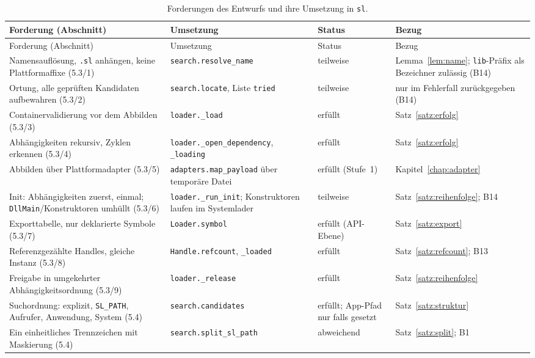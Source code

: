 {\small
\begin{longtable}{@{}L{4.1cm}L{4.5cm}L{2.2cm}L{3.6cm}@{}}
\caption{Forderungen des Entwurfs und ihre Umsetzung in \texttt{sl}.}\label{tab:konformitaet}\\
\toprule
Forderung (Abschnitt) & Umsetzung & Status & Bezug \\
\midrule
\endfirsthead
\toprule
Forderung (Abschnitt) & Umsetzung & Status & Bezug \\
\midrule
\endhead
\bottomrule
\endfoot
Namensauflösung, \texttt{.sl} anhängen, keine Plattformaffixe (5.3/1) & \texttt{search.resolve\_name} & teilweise & Lemma~\ref{lem:name}; \texttt{lib}-Präfix als Bezeichner zulässig (B14) \\[0.3em]
Ortung, alle geprüften Kandidaten aufbewahren (5.3/2) & \texttt{search.locate}, Liste \texttt{tried} & teilweise & nur im Fehlerfall zurückgegeben (B14) \\[0.3em]
Containervalidierung vor dem Abbilden (5.3/3) & \texttt{loader.\_load} & erfüllt & Satz~\ref{satz:erfolg} \\[0.3em]
Abhängigkeiten rekursiv, Zyklen erkennen (5.3/4) & \texttt{loader.\_open\_dependency}, \texttt{\_loading} & erfüllt & Satz~\ref{satz:erfolg} \\[0.3em]
Abbilden über Plattformadapter (5.3/5) & \texttt{adapters.map\_payload} über temporäre Datei & erfüllt (Stufe~1) & Kapitel~\ref{chap:adapter} \\[0.3em]
Init: Abhängigkeiten zuerst, einmal; \texttt{DllMain}/Konstruktoren umhüllt (5.3/6) & \texttt{loader.\_run\_init}; Konstruktoren laufen im Systemlader & teilweise & Satz~\ref{satz:reihenfolge}; B14 \\[0.3em]
Exporttabelle, nur deklarierte Symbole (5.3/7) & \texttt{Loader.symbol} & erfüllt (API-Ebene) & Satz~\ref{satz:export} \\[0.3em]
Referenzgezählte Handles, gleiche Instanz (5.3/8) & \texttt{Handle.refcount}, \texttt{\_loaded} & erfüllt & Satz~\ref{satz:refcount}; B13 \\[0.3em]
Freigabe in umgekehrter Abhängigkeitsordnung (5.3/9) & \texttt{loader.\_release} & erfüllt & Satz~\ref{satz:reihenfolge} \\[0.3em]
Suchordnung: explizit, \texttt{SL\_PATH}, Aufrufer, Anwendung, System (5.4) & \texttt{search.candidates} & erfüllt; App-Pfad nur falls gesetzt & Satz~\ref{satz:struktur} \\[0.3em]
Ein einheitliches Trennzeichen mit Maskierung (5.4) & \texttt{search.split\_sl\_path} & abweichend & Satz~\ref{satz:split}; B1 \\[0.3em]

\end{longtable}}
